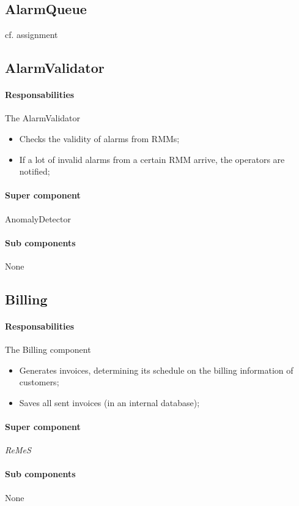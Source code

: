\documentclass[a4paper,10pt]{article}
\newcommand{\rem}{\emph{ReMeS}\xspace}
\begin{document}
\subsection{AlarmQueue}
cf. assignment

\subsection{AlarmValidator}
\paragraph{Responsabilities} 
The AlarmValidator
\begin{itemize}
	\item Checks the validity of alarms from RMMs;
    \item If a lot of invalid alarms from a certain RMM arrive, the operators are notified;
\end{itemize}

\paragraph{Super component} AnomalyDetector 

\paragraph{Sub components} None

\subsection{Billing}
\paragraph{Responsabilities} 
The Billing component
\begin{itemize}
	\item Generates invoices, determining its schedule on the billing information of customers;
    \item Saves all sent invoices (in an internal database);
\end{itemize}

\paragraph{Super component} \rem

\paragraph{Sub components} None
\end{document}
